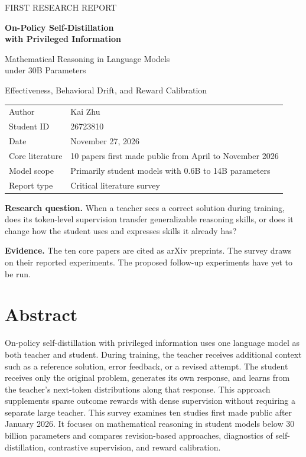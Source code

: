 \documentclass[11pt,a4paper]{article}
\newcommand{\studentid}{26723810}
\newcommand{\studentname}{Kai Zhu}
\newcommand{\reportdate}{November 27, 2026}
\begin{document}
\hypersetup{pageanchor=false}
\begin{titlepage}
\setlength{\parindent}{0pt}
\vspace*{17mm}
{\large\sffamily\color{accent}FIRST RESEARCH REPORT\par}
\vspace{10mm}
{\Huge\bfseries\color{ink}On-Policy Self-Distillation\\[0.15em]
with Privileged Information\par}
\vspace{5mm}
{\LARGE\color{ink}Mathematical Reasoning in Language Models\\
under 30B Parameters\par}
\vspace{5mm}
{\large Effectiveness, Behavioral Drift, and Reward Calibration\par}
\vspace{15mm}
\begin{tabular}{@{}ll}
Author & \studentname\\
Student ID & \studentid\\
Date & \reportdate\\
Core literature & 10 papers first made public from April to November 2026\\
Model scope & Primarily student models with 0.6B to 14B parameters\\
Report type & Critical literature survey\\
\end{tabular}
\vfill
\noindent\colorbox{ink!6}{\parbox{\dimexpr\linewidth-2\fboxsep\relax}{\small
\textbf{Research question.} When a teacher sees a correct solution during training, does its token-level supervision transfer generalizable reasoning skills, or does it change how the student uses and expresses skills it already has?
\par\medskip
\textbf{Evidence.} The ten core papers are cited as arXiv preprints. The survey draws on their reported experiments. The proposed follow-up experiments have yet to be run.}}
\end{titlepage}
\hypersetup{pageanchor=true}
\section*{Abstract}
On-policy self-distillation with privileged information uses one language model as both teacher and student. During training, the teacher receives additional context such as a reference solution, error feedback, or a revised attempt. The student receives only the original problem, generates its own response, and learns from the teacher's next-token distributions along that response. This approach supplements sparse outcome rewards with dense supervision without requiring a separate large teacher. This survey examines ten studies first made public after January 2026. It focuses on mathematical reasoning in student models below 30 billion parameters and compares revision-based approaches, diagnostics of self-distillation, contrastive supervision, and reward calibration.
\end{document}
